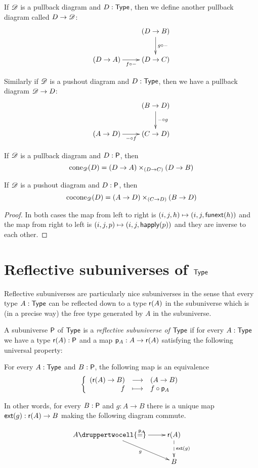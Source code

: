 \begin{defn}
  If $\Ddiag$ is a pullback diagram and $D:\type$, then we define another
  pullback diagram called $D\to\Ddiag$:
  \[\xymatrix{& (D\to B) \ar^{g\circ-}[d] \\ (D\to A) \ar_{f\circ-}[r] & (D\to
    C)}\]

  Similarly if $\Ddiag$ is a pushout diagram and $D:\type$, then we have a
  pullback diagram $\Ddiag\to{}D$:
  \[\xymatrix{& (B\to D) \ar^{-\circ{}g}[d] \\ (A\to D) \ar_{-\circ{}f}[r] &
    (C\to D)}\]
\end{defn}

\begin{lem}
  \label{coneispb}
  If $\Ddiag$ is a pullback diagram and $D:\P$, then
  \[\cone{\Ddiag}{D}=(D\to{}A)\times_{(D\to{}C)}(D\to{}B)\]

  If $\Ddiag$ is a pushout diagram and $D:\P$, then
  \[\cocone{\Ddiag}{D}=(A\to{}D)\times_{(C\to{}D)}(B\to{}D)\]
\end{lem}
\begin{proof}
  In both cases the map from left to right is $(i,j,h)\mapsto(i,j,\funext(h))$
  and the map from right to left is $(i,j,p)\mapsto(i,j,\happly(p))$ and they
  are inverse to each other.
\end{proof}

\section{Reflective subuniverses of $\type$}

Reflective subuniverses are particularly nice subuniverses in the sense that
every type $A:\type$ can be reflected down to a type $\reflect(A)$ in the
subuniverse which is (in a precise way) the free type generated by $A$ in the
subuniverse.

\begin{defn}
  A subuniverse $\P$ of $\type$ is a \emph{reflective subuniverse of $\type$} if
  for every $A:\type$ we have a type $\reflect(A):\P$ and a map
  $\project_A:A\to\reflect(A)$ satisfying the following universal property:

  For every $A:\type$ and $B:\P$, the following map is an equivalence
  \[\function{(\reflect(A)\to{}B)}{(A\to{}B)}{f}{f\circ\project_A}\]

  In other words, for every $B:\P$ and $g:A\to{}B$ there is a unique map
  $\ext(g):\reflect(A)\to{}B$ making the following diagram commute.

  \[\uppercurveobject{{ }}\lowercurveobject{{ }}\twocellhead{{ }}
  \xymatrix{A \ar^{\project_A}[r] \ar_g[rd] \druppertwocell{=} & \reflect(A)
    \ar@{-->}^{\ext(g)}[d] \\
    & B}\]
\end{defn}

